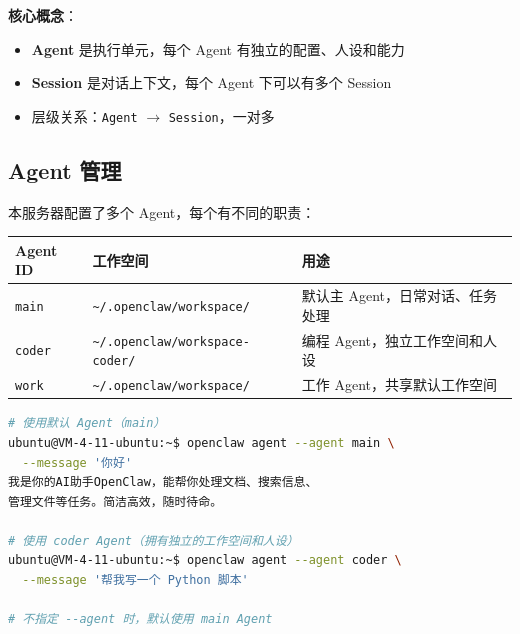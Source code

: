 \begin{figure}[htbp]
\centering
{}
\end{figure}

\textbf{核心概念}：

\begin{itemize}
  \item \textbf{Agent} 是执行单元，每个 Agent 有独立的配置、人设和能力
  \item \textbf{Session} 是对话上下文，每个 Agent 下可以有多个 Session
  \item 层级关系：\texttt{Agent} $\rightarrow$ \texttt{Session}，一对多
\end{itemize}

\subsection{Agent 管理}


本服务器配置了多个 Agent，每个有不同的职责：

\begin{table}[h]
\centering
\small
\begin{tabular}{|l|l|l|}
\hline
Agent ID & 工作空间 & 用途 \\
\hline
\texttt{main} & \texttt{\textasciitilde{}/.openclaw/workspace/} & 默认主 Agent，日常对话、任务处理 \\
\hline
\texttt{coder} & \texttt{\textasciitilde{}/.openclaw/workspace-coder/} & 编程 Agent，独立工作空间和人设 \\
\hline
\texttt{work} & \texttt{\textasciitilde{}/.openclaw/workspace/} & 工作 Agent，共享默认工作空间 \\
\hline
\end{tabular}
\end{table}

\begin{lstlisting}[language=bash]
# 使用默认 Agent（main）
ubuntu@VM-4-11-ubuntu:~$ openclaw agent --agent main \
  --message '你好'
我是你的AI助手OpenClaw，能帮你处理文档、搜索信息、
管理文件等任务。简洁高效，随时待命。

# 使用 coder Agent（拥有独立的工作空间和人设）
ubuntu@VM-4-11-ubuntu:~$ openclaw agent --agent coder \
  --message '帮我写一个 Python 脚本'

# 不指定 --agent 时，默认使用 main Agent
\end{lstlisting}

